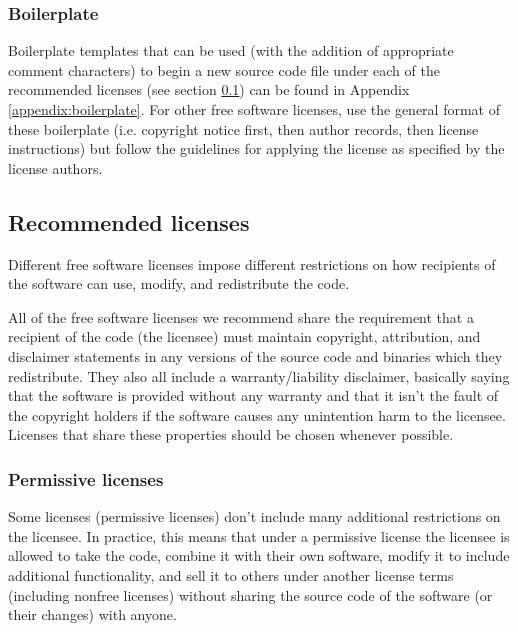 \documentclass[10pt,a4paper]{article}
\begin{document}
\subsubsection{Boilerplate}

\par Boilerplate templates that can be used (with the addition of appropriate 
comment characters) to begin a new source code file under each of the 
recommended licenses (see section \ref{section:impnotes.recommended}) can 
be found in Appendix \ref{appendix:boilerplate}. For other free software licenses, 
use the general format of these boilerplate (i.e. copyright notice first, then 
author records, then license instructions) but follow the guidelines for applying 
the license as specified by the license authors. 


\subsection{Recommended licenses}
\label{section:impnotes.recommended}

\par Different free software licenses impose different restrictions on how recipients 
of the software can use, modify, and redistribute the code. 

\par All of the free software licenses we recommend share the requirement that 
a recipient of the code (the licensee) must maintain copyright, attribution, and disclaimer 
statements in any versions of the source code and binaries which they redistribute. 
They also all include a warranty/liability disclaimer, basically saying that the software 
is provided without any warranty and that it isn't the fault of the copyright holders if 
the software causes any unintention harm to the licensee. Licenses that share these 
properties should be chosen whenever possible. 

\subsubsection{Permissive licenses}
\label{section:impnotes.recommended.permissive}
\par Some licenses (permissive licenses) don't include many additional restrictions on 
the licensee. In practice, this means that under a permissive license the licensee is 
allowed to take the code, combine it with their own software, modify it to include 
additional functionality, and sell it to others under another license terms (including 
nonfree licenses) without sharing the source code of the software (or their changes) 
with anyone. 
\end{document}
